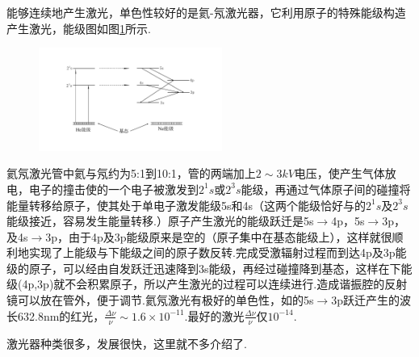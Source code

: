 能够连续地产生激光，单色性较好的是氦-氖激光器，它利用原子的特殊能级构造产生激光，能级图如图\ref{fig.9-4}所示.
\begin{figure}[!h]
	\centering
	\small
	\includegraphics[width=6cm,clip]{QM file/figure/9-4}
	\caption{}\label{fig.9-4}
\end{figure}
\noindent 氦氖激光管中氦与氖约为5:1到10:1，管的两端加上$2\sim3\si{kV}$电压，使产生气体放电，电子的撞击使的一个电子被激发到$2^{1}\si{s}$或$2^{3}\si{s}$能级，再通过气体原子间的碰撞将能量转移给原子，使其处于单电子激发能级5s和4s（这两个能级恰好与的$2^{1}\si{s}$及$2^{3}\si{s}$能级接近，容易发生能量转移.）原子产生激光的能级跃迁是5s$\rightarrow$4p，5s$\rightarrow$3p，及4s$\rightarrow$3p，由于4p及3p能级原来是空的（原子集中在基态能级上），这样就很顺利地实现了上能级与下能级之间的原子数反转.完成受激辐射过程而到达4p及3p能级的原子，可以经由自发跃迁迅速降到3s能级，再经过碰撞降到基态，这样在下能级(4p,3p)就不会积累原子，所以产生激光的过程可以连续进行.造成谐振腔的反射镜可以放在管外，便于调节.氦氖激光有极好的单色性，如的5s$\rightarrow$3p跃迁产生的波长\num{632.8}\si{nm}的红光，$\frac{\Delta\nu}{\nu}\sim\num{1.6}\times10^{-11}$.最好的激光$\frac{\Delta\nu}{\nu}$仅$10^{-14}$.

激光器种类很多，发展很快，这里就不多介绍了.
